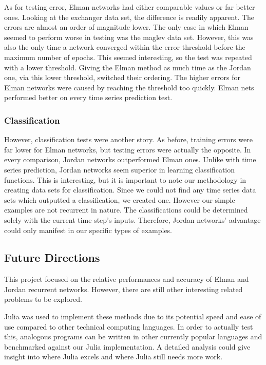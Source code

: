 \documentclass{acm_proc_article-sp}
\begin{document}
As for testing error, Elman networks had either comparable values or far better ones.
Looking at the exchanger data set, the difference is readily apparent.
The errors are almost an order of magnitude lower.
The only case in which Elman seemed to perform worse in testing was the maglev data set.
However, this was also the only time a network converged within the error threshold before the maximum number of epochs.
This seemed interesting, so the test was repeated with a lower threshold.
Giving the Elman method as much time as the Jordan one, via this lower threshold, switched their ordering.
The higher errors for Elman networks were caused by reaching the threshold too quickly.
Elman nets performed better on every time series prediction test.

\subsubsection{Classification}
However, classification tests were another story.
As before, training errors were far lower for Elman networks, but testing errors were actually the opposite.
In every comparison, Jordan networks outperformed Elman ones.
Unlike with time series prediction, Jordan networks seem superior in learning classification functions.
This is interesting, but it is important to note our methodology in creating data sets for classification.
Since we could not find any time series data sets which outputted a classification, we created one.
However our simple examples are not recurrent in nature.
The classifications could be determined solely with the current time step's inputs.
Therefore, Jordan networks' advantage could only manifest in our specific types of examples.

\subsection{Future Directions}
This project focused on the relative performances and accuracy of Elman and Jordan recurrent networks.
However, there are still other interesting related problems to be explored.

Julia was used to implement these methods due to its potential speed and ease of use compared to other technical computing languages.
In order to actually test this, analogous programs can be written in other currently popular languages and benchmarked against our Julia implementation.
A detailed analysis could give insight into where Julia excels and where Julia still needs more work.
\end{document}
